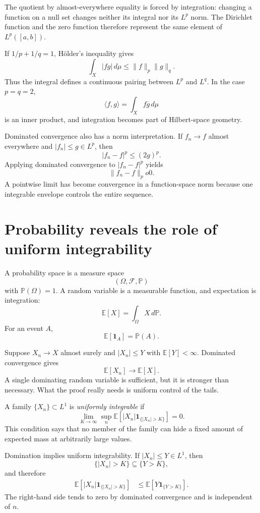 The quotient by almost-everywhere equality is forced by integration: changing a function on a null set changes neither its integral nor its \(L^p\) norm.  The Dirichlet function and the zero function therefore represent the same element of \(L^p([a,b])\).

If \(1/p+1/q=1\), Hölder's inequality gives
\[
  \int_X|fg|\,d\mu
  \le\|f\|_p\|g\|_q.
\]
Thus the integral defines a continuous pairing between \(L^p\) and \(L^q\).  In the case \(p=q=2\),
\[
  \langle f,g\rangle=\int_Xf\overline g\,d\mu
\]
is an inner product, and integration becomes part of Hilbert-space geometry.

Dominated convergence also has a norm interpretation.  If \(f_n\to f\) almost everywhere and \(|f_n|\le g\in L^p\), then
\[
  |f_n-f|^p\le(2g)^p.
\]
Applying dominated convergence to \(|f_n-f|^p\) yields
\[
  \|f_n-f\|_p	o0.
\]
A pointwise limit has become convergence in a function-space norm because one integrable envelope controls the entire sequence.

\section{Probability reveals the role of uniform integrability}

A probability space is a measure space
\[
  (\Omega,\mathcal F,\mathbb P)
\]
with \(\mathbb P(\Omega)=1\).  A random variable is a measurable function, and expectation is integration:
\[
  \mathbb E[X]=\int_{\Omega}X\,d\mathbb P.
\]
For an event \(A\),
\[
  \mathbb E[\mathbf1_A]=\mathbb P(A).
\]

Suppose \(X_n\to X\) almost surely and \(|X_n|\le Y\) with \(\mathbb E[Y]<\infty\).  Dominated convergence gives
\[
  \mathbb E[X_n]\to\mathbb E[X].
\]
A single dominating random variable is sufficient, but it is stronger than necessary.  What the proof really needs is uniform control of the tails.

A family \(\{X_n\}\subset L^1\) is \emph{uniformly integrable} if
\[
  \lim_{K\to\infty}
  \sup_n
  \mathbb E\left[
    |X_n|\mathbf1_{\{|X_n|>K\}}
  \right]
  =0.
\]
This condition says that no member of the family can hide a fixed amount of expected mass at arbitrarily large values.

Domination implies uniform integrability.  If \(|X_n|\le Y\in L^1\), then
\[
  \{|X_n|>K\}\subseteq\{Y>K\},
\]
and therefore
\[
\begin{aligned}
  \mathbb E\left[
    |X_n|\mathbf1_{\{|X_n|>K\}}
  \right]
  &\le
  \mathbb E\left[
    Y\mathbf1_{\{Y>K\}}
  \right].
\end{aligned}
\]
The right-hand side tends to zero by dominated convergence and is independent of \(n\).

